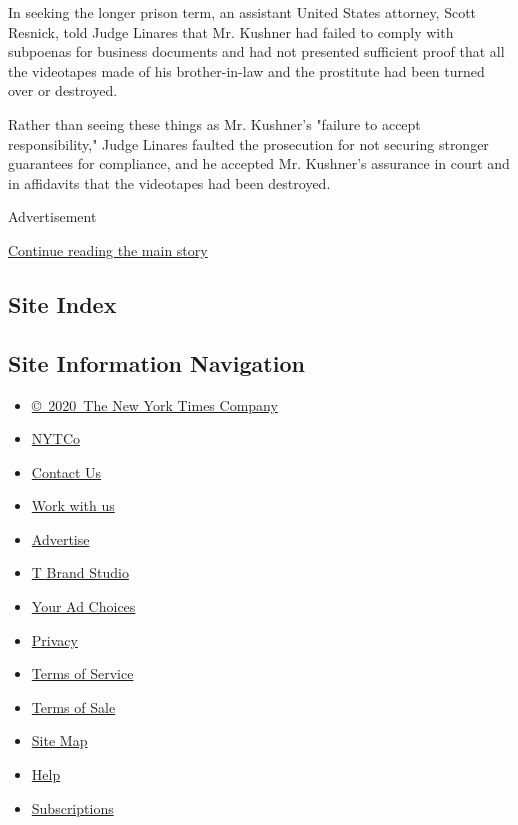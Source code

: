 In seeking the longer prison term, an assistant United States attorney,
Scott Resnick, told Judge Linares that Mr. Kushner had failed to comply
with subpoenas for business documents and had not presented sufficient
proof that all the videotapes made of his brother-in-law and the
prostitute had been turned over or destroyed.

Rather than seeing these things as Mr. Kushner's "failure to accept
responsibility," Judge Linares faulted the prosecution for not securing
stronger guarantees for compliance, and he accepted Mr. Kushner's
assurance in court and in affidavits that the videotapes had been
destroyed.

Advertisement

\protect\hyperlink{after-bottom}{Continue reading the main story}

\hypertarget{site-index}{%
\subsection{Site Index}\label{site-index}}

\hypertarget{site-information-navigation}{%
\subsection{Site Information
Navigation}\label{site-information-navigation}}

\begin{itemize}
\tightlist
\item
  \href{https://help.nytimes.com/hc/en-us/articles/115014792127-Copyright-notice}{©~2020~The
  New York Times Company}
\end{itemize}

\begin{itemize}
\tightlist
\item
  \href{https://www.nytco.com/}{NYTCo}
\item
  \href{https://help.nytimes.com/hc/en-us/articles/115015385887-Contact-Us}{Contact
  Us}
\item
  \href{https://www.nytco.com/careers/}{Work with us}
\item
  \href{https://nytmediakit.com/}{Advertise}
\item
  \href{http://www.tbrandstudio.com/}{T Brand Studio}
\item
  \href{https://www.nytimes.com/privacy/cookie-policy\#how-do-i-manage-trackers}{Your
  Ad Choices}
\item
  \href{https://www.nytimes.com/privacy}{Privacy}
\item
  \href{https://help.nytimes.com/hc/en-us/articles/115014893428-Terms-of-service}{Terms
  of Service}
\item
  \href{https://help.nytimes.com/hc/en-us/articles/115014893968-Terms-of-sale}{Terms
  of Sale}
\item
  \href{https://spiderbites.nytimes.com}{Site Map}
\item
  \href{https://help.nytimes.com/hc/en-us}{Help}
\item
  \href{https://www.nytimes.com/subscription?campaignId=37WXW}{Subscriptions}
\end{itemize}
